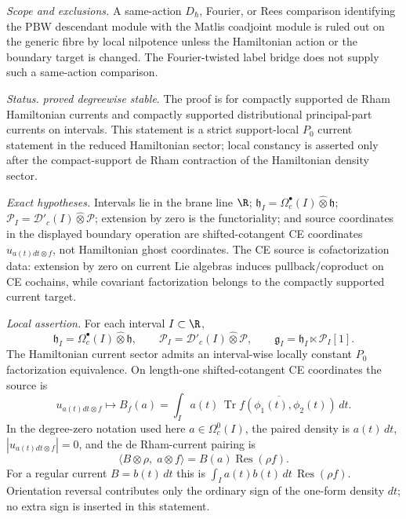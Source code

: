 \begin{stmt}
  \emph{Scope and exclusions.} A same-action \(D_\hbar\), Fourier, or Rees
  comparison identifying the PBW descendant module with the Matlis
  coadjoint module is ruled out on the generic fibre by local nilpotence
  unless the Hamiltonian action or the boundary target is changed.  The
  Fourier-twisted label bridge does not supply such a same-action
  comparison.
\end{stmt}

\begin{stmt}\label{thm:lane-factorization-current}
  \emph{Status.} \emph{proved degreewise stable}.  The proof is for
  compactly supported de Rham Hamiltonian currents and compactly
  supported distributional principal-part currents on intervals.  This
  statement is a strict support-local \(P_0\) current statement in the
  reduced Hamiltonian sector; local constancy is asserted only after the
  compact-support de Rham contraction of the Hamiltonian density sector.

  \emph{Exact hypotheses.} Intervals lie in the brane line \(\R\);
  \(\mathfrak h_I=\Omega^\bullet_c(I)\widehat\otimes\mathfrak h\);
  \(\mathcal P_I=\mathcal D'_c(I)\widehat\otimes\mathcal P\);
  extension by zero is the functoriality; and source coordinates in the
  displayed boundary operation are shifted-cotangent CE coordinates
  \(u_{a(t)dt\otimes f}\), not Hamiltonian ghost coordinates.  The CE
  source is cofactorization data: extension by zero on current Lie
  algebras induces pullback/coproduct on CE cochains, while covariant
  factorization belongs to the compactly supported current target.

  \emph{Local assertion.} For each interval \(I\subset\R\),
  \[
    \mathfrak h_I=\Omega^\bullet_c(I)\widehat\otimes\mathfrak h,\qquad
    \mathcal P_I=\mathcal D'_c(I)\widehat\otimes\mathcal P,\qquad
    \mathfrak g_I=\mathfrak h_I\ltimes\mathcal P_I[1].
  \]
  The Hamiltonian current sector admits an interval-wise locally constant
  \(P_0\) factorization equivalence.  On length-one shifted-cotangent
  CE coordinates the source is
  \[
    u_{a(t)dt\otimes f}\longmapsto
    B_f(a)=
    \int_I a(t)\,
    \overline{\operatorname{Tr}f(\phi_1(t),\phi_2(t))}\,dt .
  \]
  In the degree-zero notation used here \(a\in\Omega^0_c(I)\), the
  paired density is \(a(t)\,dt\), \(|u_{a(t)dt\otimes f}|=0\), and the
  de Rham-current pairing is
  \[
    \langle B\otimes\rho,\;a\otimes f\rangle
    =B(a)\operatorname{Res}(\rho f).
  \]
  For a regular current \(B=b(t)\,dt\) this is
  \(\int_I a(t)b(t)\,dt\,\operatorname{Res}(\rho f)\).  Orientation
  reversal contributes only the ordinary sign of the one-form density
  \(dt\); no extra sign is inserted in this statement.


\end{stmt}
